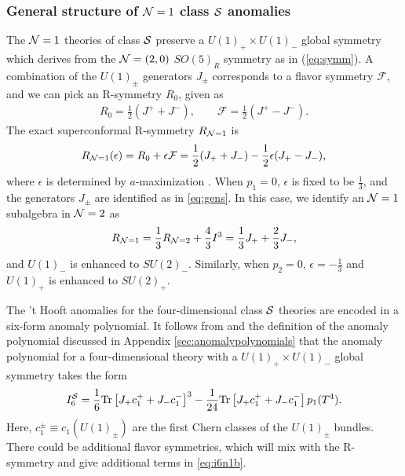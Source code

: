 \documentclass[a4paper,11pt]{article}
\newcommand{\ba}[1]{\begin{align} #1 \end{align} }
\def\tr{\text{Tr}}
\def\CN{{\cal N}}
\def\CS{{\cal S}}
\newcommand{\mc}[1]{\mathcal{ #1} }
\begin{document}
\subsubsection*{General structure of $\CN=1$ class $\CS$ anomalies}%


The $\CN=1$ theories of class $\CS$ preserve a $U(1)_+\times U(1)_-$ global symmetry which derives from the $\CN=(2,0)$ $SO(5)_R$ symmetry as in (\ref{eq:symm}). 
A combination of the $U(1)_\pm$ generators $J_\pm$ corresponds to a flavor symmetry $\mc{F}$, and we can pick an R-symmetry $R_0$, given as  
	\ba{
	R_0=\frac{1}{2}(J^++J^-),\qquad \mc{F}=\frac{1}{2}(J^+-J^-).\label{eq:r0f}
	}
The exact superconformal R-symmetry $R_{\CN=1}$ is 
	\ba{
	R_{\CN=1}(\epsilon)=R_0+\epsilon \mc{F}=\frac{1}{2} (J_+ + J_-) - \frac{1}{2} \epsilon (J_+ - J_-),\label{eq:sr}
	}
where $\epsilon$ is determined by $a$-maximization \cite{Intriligator:2003jj}. When $p_1=0$, $\epsilon$ is fixed to be $\frac{1}{3}$, and the generators $J_\pm$ are identified as in \eqref{eq:gens}. In this case, we identify an $\CN=1$ subalgebra in $\CN=2$ as
	\ba{
	R_{\CN=1}=\frac{1}{3}R_{\CN=2} + \frac{4}{3}I^3 = \frac{1}{3} J_+ + \frac{2}{3}J_-,
	}
and $U(1)_-$ is enhanced to $SU(2)_-$. Similarly, when $p_2=0$, $\epsilon=-\frac{1}{3}$ and $U(1)_+$ is enhanced to $SU(2)_+$.

The 't Hooft anomalies for the four-dimensional class $\CS$ theories are encoded in a six-form anomaly polynomial. It follows from \cite{Anselmi:1997am} and the definition of the anomaly polynomial discussed in Appendix \ref{sec:anomalypolynomials} that the anomaly polynomial for a four-dimensional theory with a $U(1)_+\times U(1)_-$ global symmetry takes the form
	\begin{equation}
	I_6^{\CS} = \frac{1}{6} \tr \left[ J_+ c_1^+ + J_- c_1^-\right]^3 - \frac{1}{24} \tr \left[ J_+ c_1^+ + J_- c_1^-\right]p_1(T^4).   \label{eq:i6n1b}
	\end{equation}
Here, $c_1^\pm \equiv c_1(U(1)_\pm)$ are the first Chern classes of the $U(1)_\pm$ bundles. 
There could be additional flavor symmetries, which will mix with the R-symmetry and give additional terms in \eqref{eq:i6n1b}.
	
\end{document}
